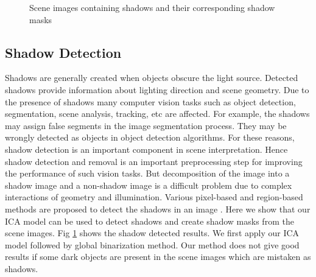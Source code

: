 \begin{figure}[t]
{}
\caption
{Scene images containing shadows and their corresponding shadow masks}
\label{fig:shadow}
\end{figure}

\subsection{Shadow Detection}
Shadows are generally created when objects obscure the light source. 
Detected shadows provide information about
lighting direction and scene geometry.
Due to the presence of shadows many computer vision 
tasks such as object detection, segmentation, scene analysis, tracking, etc are affected.
For example, the shadows may assign false segments in the 
image segmentation process. They may be wrongly detected as objects in 
object detection algorithms.
For these reasons,
shadow detection is an important component in scene interpretation.
Hence 
shadow detection and removal is an important preprocessing step for improving the performance of such vision tasks.
But decomposition of the image into a shadow image and a non-shadow image
is a difficult problem due to 
complex interactions of geometry and illumination.
Various pixel-based and region-based methods are
proposed to detect the shadows in an image \cite{chap4-8, chap4-9, chap4-10, chap4-11}.
Here we show that our ICA model can be used to detect shadows and create shadow masks from the scene images.
Fig \ref{fig:shadow} shows the shadow detected results. We first apply our ICA model followed by
global binarization method. Our method does not give good results if some dark objects are present in the scene
images which are mistaken as shadows.

